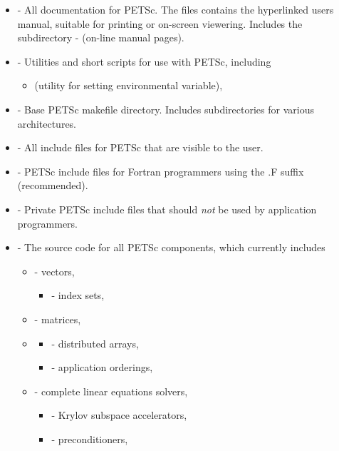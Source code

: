 \begin{itemize}
\item {} - All documentation for PETSc. The files 
                   contains the hyperlinked users manual, suitable for printing
                   or on-screen viewering. Includes the subdirectory
 \subitem -  (on-line manual pages).
\item {} - Utilities and short scripts for use with PETSc, including
 \begin{itemize}
 \item {} (utility for setting  environmental variable),
 \end{itemize}

\item {} - Base PETSc makefile directory.  Includes subdirectories
                    for various architectures.
\item {} - All include files for PETSc that are visible to the user.
\item {}    - PETSc include files for Fortran programmers using 
                                  the .F suffix (recommended).
\item {}    - Private PETSc include files that should {\em not} 
                                  be used by application programmers.
\item {} - The source code for all PETSc components, which
                  currently includes
 \begin{itemize}
 \item {} - vectors,
   \begin{itemize}
     \item {} - index sets,
   \end{itemize}
 \item {} - matrices,
 \item {}
   \begin{itemize}
    \item {} - distributed arrays,
    \item {} - application orderings,
   \end{itemize}
 \item {} - complete linear equations solvers,
 \begin{itemize}
   \item {} - Krylov subspace accelerators,
   \item {} - preconditioners,

\end{itemize}
\end{itemize}
\end{itemize}

